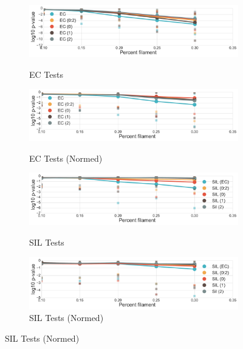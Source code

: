 \documentclass[12pt]{article}
\begin{document}
\begin{center}
  \begin{figure}[htp!]
    \centering
    \begin{subfigure}{.45\textwidth}
      \centering
      \caption{EC Tests}
      \includegraphics[width=\linewidth]{figure_8_euler_group.pdf}
      \label{fig:sub_euler}
    \end{subfigure}
    \begin{subfigure}{.45\textwidth}
      \centering
      \caption{EC Tests (Normed)}
      \includegraphics[width=\linewidth]{figure_8_euler_group_normed.pdf}
      \label{fig:sub_euler_normed}
    \end{subfigure}
    \begin{subfigure}{.45\textwidth}
      \centering
      \caption{SIL Tests}
      \includegraphics[width=\linewidth]{figure_8_silhouette_group.pdf}
      \label{fig:sub_silh}
    \end{subfigure}
    \begin{subfigure}{.45\textwidth}
      \centering
      \caption{SIL Tests (Normed)}
      \includegraphics[width=\linewidth]{figure_8_silhouette_group_normed.pdf}

\end{subfigure}
\end{figure}
\end{center}
\end{document}
